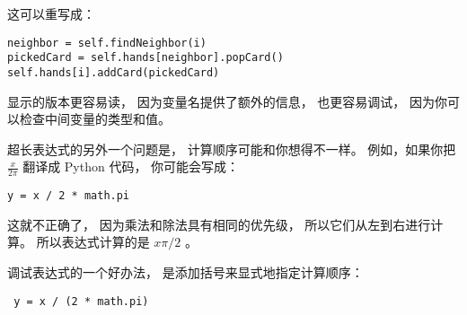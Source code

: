 
这可以重写成：

\begin{lstlisting}
neighbor = self.findNeighbor(i)
pickedCard = self.hands[neighbor].popCard()
self.hands[i].addCard(pickedCard)
\end{lstlisting}


显示的版本更容易读， 因为变量名提供了额外的信息， 也更容易调试， 因为你可以检查中间变量的类型和值。  



超长表达式的另外一个问题是， 计算顺序可能和你想得不一样。  
例如，如果你把 $\frac{x}{2 \pi}$ 翻译成 Python 代码， 你可能会写成：

\begin{lstlisting}
y = x / 2 * math.pi
\end{lstlisting}


这就不正确了， 因为乘法和除法具有相同的优先级， 所以它们从左到右进行计算。  
所以表达式计算的是 $x \pi / 2$ 。  


调试表达式的一个好办法， 是添加括号来显式地指定计算顺序：

\begin{lstlisting}
 y = x / (2 * math.pi)
\end{lstlisting}


